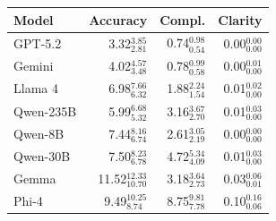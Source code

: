 

\small
\begin{tabular}{@{}lrrr@{}}
\toprule
\textbf{Model} & \textbf{Accuracy} & \textbf{Compl.} & \textbf{Clarity} \\
\midrule
GPT-5.2 & 3.32$_{\scriptstyle 2.81}^{\scriptstyle 3.85}$ & 0.74$_{\scriptstyle 0.54}^{\scriptstyle 0.98}$ & 0.00$_{\scriptstyle 0.00}^{\scriptstyle 0.00}$ \\
Gemini & 4.02$_{\scriptstyle 3.48}^{\scriptstyle 4.57}$ & 0.78$_{\scriptstyle 0.58}^{\scriptstyle 0.99}$ & 0.00$_{\scriptstyle 0.00}^{\scriptstyle 0.01}$ \\
Llama 4 & 6.98$_{\scriptstyle 6.32}^{\scriptstyle 7.66}$ & 1.88$_{\scriptstyle 1.54}^{\scriptstyle 2.24}$ & 0.01$_{\scriptstyle 0.00}^{\scriptstyle 0.02}$ \\
Qwen-235B & 5.99$_{\scriptstyle 5.32}^{\scriptstyle 6.68}$ & 3.16$_{\scriptstyle 2.70}^{\scriptstyle 3.67}$ & 0.01$_{\scriptstyle 0.00}^{\scriptstyle 0.03}$ \\
Qwen-8B & 7.44$_{\scriptstyle 6.74}^{\scriptstyle 8.16}$ & 2.61$_{\scriptstyle 2.19}^{\scriptstyle 3.05}$ & 0.00$_{\scriptstyle 0.00}^{\scriptstyle 0.00}$ \\
Qwen-30B & 7.50$_{\scriptstyle 6.78}^{\scriptstyle 8.23}$ & 4.72$_{\scriptstyle 4.09}^{\scriptstyle 5.34}$ & 0.01$_{\scriptstyle 0.00}^{\scriptstyle 0.03}$ \\
Gemma & 11.52$_{\scriptstyle 10.70}^{\scriptstyle 12.33}$ & 3.18$_{\scriptstyle 2.73}^{\scriptstyle 3.64}$ & 0.03$_{\scriptstyle 0.01}^{\scriptstyle 0.06}$ \\
Phi-4 & 9.49$_{\scriptstyle 8.74}^{\scriptstyle 10.25}$ & 8.75$_{\scriptstyle 7.78}^{\scriptstyle 9.81}$ & 0.10$_{\scriptstyle 0.06}^{\scriptstyle 0.16}$ \\
\bottomrule
\end{tabular}
\label{tab:mqm-dimensions}

